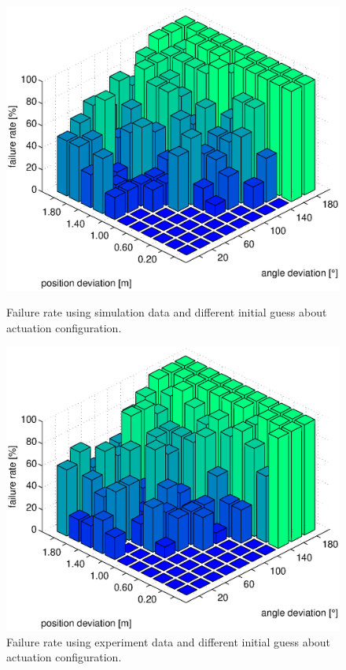 \begin{figure}[hbtp]
\centering
\includegraphics[width = \textwidth]{images/results/convergence_analysis_init_deviation_sim_bar.eps}
\caption{Failure rate using simulation data and different initial guess about actuation configuration.}
\label{fig:result_sim_convergece_region}
%
\centering
\includegraphics[width = \textwidth]{images/results/convergence_analysis_init_deviation_real_bar.eps}
\caption{Failure rate using experiment data and different initial guess about actuation configuration.}
\label{fig:result_real_convergece_region}
\end{figure}


